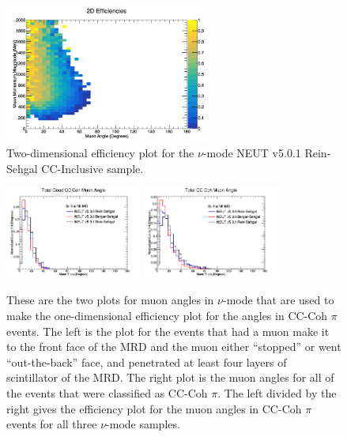 \documentclass[11pt]{article}
\begin{document}
\begin{figure}[H]
\centering
\includegraphics[width=0.6\textwidth]{CCInclusivePlots/2DEffCompareNMORS.png}
\caption{Two-dimensional efficiency plot for the $\nu$-mode NEUT v5.0.1 Rein-Sehgal CC-Inclusive sample.}
\label{fig:app:NMCCInclusiveMuon2DEffORS}
\end{figure}

\begin{figure}[H]
\centering
\includegraphics[width=0.4\textwidth]{NMCombinedPlotsImages/14-NMCombinedPlots.png}
\includegraphics[width=0.4\textwidth]{NMCombinedPlotsImages/16-NMCombinedPlots.png}
\caption{These are the two plots for muon angles in $\nu$-mode that are used to make the one-dimensional efficiency plot for the angles in CC-Coh $\pi$ events. The left is the plot for the events that had a muon make it to the front face of the MRD and the muon either ``stopped'' or went ``out-the-back'' face, and penetrated at least four layers of scintillator of the MRD. The right plot is the muon angles for all of the events that were classified as CC-Coh $\pi$. The left divided by the right gives the efficiency plot for the muon angles in CC-Coh $\pi$ events for all three $\nu$-mode samples.}
\label{fig:app:NMCCCohMuonAng}
\end{figure}
\end{document}
